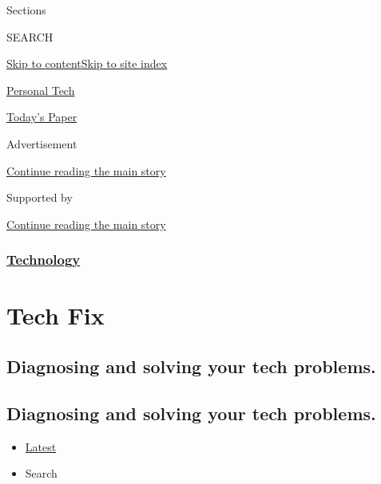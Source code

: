 Sections

SEARCH

\protect\hyperlink{site-content}{Skip to
content}\protect\hyperlink{site-index}{Skip to site index}

\href{https://www.nytimes3xbfgragh.onion/section/technology/personaltech}{Personal
Tech}

\href{https://myaccount.nytimes3xbfgragh.onion/auth/login?response_type=cookie\&client_id=vi}{}

\href{https://www.nytimes3xbfgragh.onion/section/todayspaper}{Today's
Paper}

Advertisement

\protect\hyperlink{after-top}{Continue reading the main story}

Supported by

\protect\hyperlink{after-sponsor}{Continue reading the main story}

\hypertarget{technology}{%
\subsubsection{\texorpdfstring{\href{/section/technology}{Technology}}{Technology}}\label{technology}}

\hypertarget{tech-fix}{%
\section{Tech Fix}\label{tech-fix}}

\hypertarget{diagnosing-and-solving-your-tech-problems}{%
\subsection{Diagnosing and solving your tech
problems.}\label{diagnosing-and-solving-your-tech-problems}}

\hypertarget{diagnosing-and-solving-your-tech-problems-1}{%
\subsection{Diagnosing and solving your tech
problems.}\label{diagnosing-and-solving-your-tech-problems-1}}

\begin{itemize}
\tightlist
\item
  \protect\hyperlink{stream-panel}{Latest}
\item
  Search
\end{itemize}

